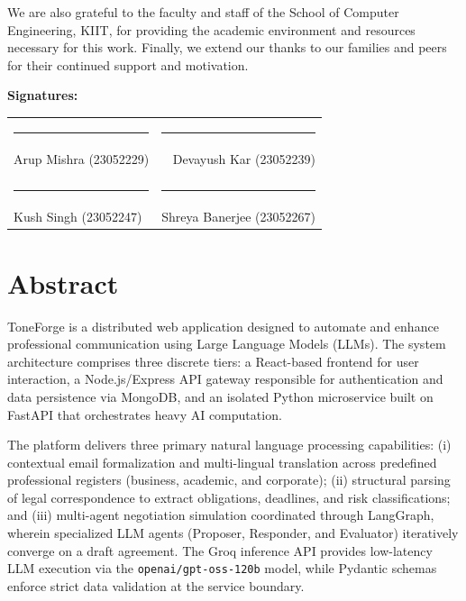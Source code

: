 \documentclass[12pt,a4paper]{report}
\begin{document}
We are also grateful to the faculty and staff of the School of Computer Engineering, KIIT, for providing the academic environment and resources necessary for this work. Finally, we extend our thanks to our families and peers for their continued support and motivation.

\vspace{2.5cm}

\noindent \textbf{Signatures:}

\vspace{1.5cm}
\noindent
\begin{tabular*}{\textwidth}{@{\extracolsep{\fill}}lr}
	\rule{5.5cm}{0.4pt} & \rule{5.5cm}{0.4pt} \\
	Arup Mishra (23052229) & Devayush Kar (23052239) \\
	\\[1.5cm]
	\rule{5.5cm}{0.4pt} & \rule{5.5cm}{0.4pt} \\
	Kush Singh (23052247) & Shreya Banerjee (23052267) \\
\end{tabular*}

\clearpage

\chapter*{Abstract}

ToneForge is a distributed web application designed to automate and enhance professional communication using Large Language Models (LLMs). The system architecture comprises three discrete tiers: a React-based frontend for user interaction, a Node.js/Express API gateway responsible for authentication and data persistence via MongoDB, and an isolated Python microservice built on FastAPI that orchestrates heavy AI computation.

The platform delivers three primary natural language processing capabilities: (i) contextual email formalization and multi-lingual translation across predefined professional registers (business, academic, and corporate); (ii) structural parsing of legal correspondence to extract obligations, deadlines, and risk classifications; and (iii) multi-agent negotiation simulation coordinated through LangGraph, wherein specialized LLM agents (Proposer, Responder, and Evaluator) iteratively converge on a draft agreement. The Groq inference API provides low-latency LLM execution via the \texttt{openai/gpt-oss-120b} model, while Pydantic schemas enforce strict data validation at the service boundary.
\end{document}
